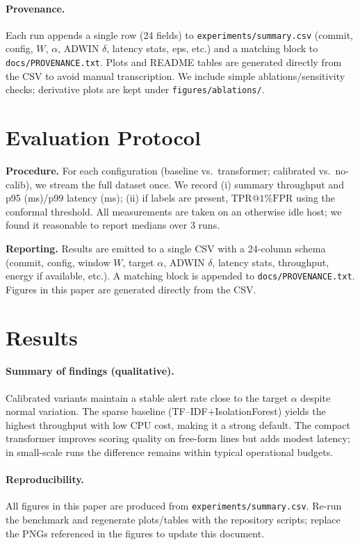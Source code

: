 \documentclass[10pt,twocolumn]{article}
\begin{document}
\paragraph{Provenance.} Each run appends a single row (24 fields) to \texttt{experiments/summary.csv} (commit, config, $W$, $\alpha$, ADWIN $\delta$, latency stats, eps, etc.) and a matching block to \texttt{docs/PROVENANCE.txt}. Plots and README tables are generated directly from the CSV to avoid manual transcription.
We include simple ablations/sensitivity checks; derivative plots are kept under \texttt{figures/ablations/}.
\section{Evaluation Protocol}
\textbf{Procedure.} For each configuration (baseline vs.\ transformer; calibrated vs.\ no-calib), we stream the full dataset once. We record (i) summary throughput and p95 (ms)/p99 latency (ms); (ii) if labels are present, $\mathrm{TPR}@1\% \mathrm{FPR}$ using the conformal threshold. All measurements are taken on an otherwise idle host; we found it reasonable to report medians over 3 runs.

\textbf{Reporting.} Results are emitted to a single CSV with a 24-column schema (commit, config, window $W$, target $\alpha$, ADWIN $\delta$, latency stats, throughput, energy if available, etc.). A matching block is appended to \texttt{docs/PROVENANCE.txt}. Figures in this paper are generated directly from the CSV.

\section{Results}
\paragraph{Summary of findings (qualitative).} Calibrated variants maintain a stable alert rate close to the target $\alpha$ despite normal variation. The sparse baseline (TF--IDF{+}IsolationForest) yields the highest throughput with low CPU cost, making it a strong default. The compact transformer improves scoring quality on free-form lines but adds modest latency; in small-scale runs the difference remains within typical operational budgets.
\paragraph{Reproducibility.} All figures in this paper are produced from \texttt{experiments/summary.csv}. Re-run the benchmark and regenerate plots/tables with the repository scripts; replace the PNGs referenced in the figures to update this document.
\end{document}
